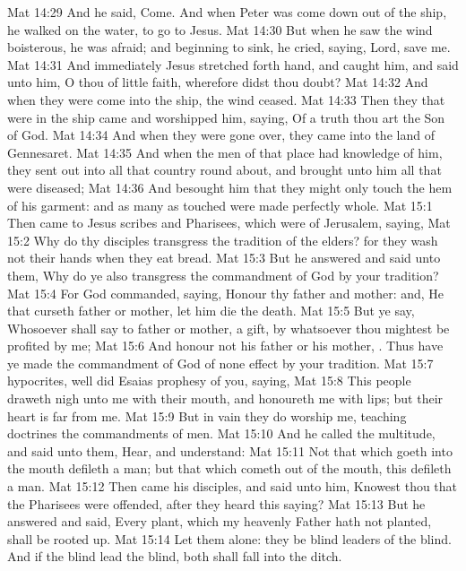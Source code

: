 \vs Mat 14:29 And he said, Come. And when Peter was come down out of the ship, he walked on the water, to go to Jesus.
\vs Mat 14:30 But when he saw the wind boisterous, he was afraid; and beginning to sink, he cried, saying, Lord, save me.
\vs Mat 14:31 And immediately Jesus stretched forth  hand, and caught him, and said unto him, O thou of little faith, wherefore didst thou doubt?
\vs Mat 14:32 And when they were come into the ship, the wind ceased.
\vs Mat 14:33 Then they that were in the ship came and worshipped him, saying, Of a truth thou art the Son of God.
\vs Mat 14:34 And when they were gone over, they came into the land of Gennesaret.
\vs Mat 14:35 And when the men of that place had knowledge of him, they sent out into all that country round about, and brought unto him all that were diseased;
\vs Mat 14:36 And besought him that they might only touch the hem of his garment: and as many as touched were made perfectly whole.
\vs Mat 15:1 Then came to Jesus scribes and Pharisees, which were of Jerusalem, saying,
\vs Mat 15:2 Why do thy disciples transgress the tradition of the elders? for they wash not their hands when they eat bread.
\vs Mat 15:3 But he answered and said unto them, Why do ye also transgress the commandment of God by your tradition?
\vs Mat 15:4 For God commanded, saying, Honour thy father and mother: and, He that curseth father or mother, let him die the death.
\vs Mat 15:5 But ye say, Whosoever shall say to  father or  mother,  a gift, by whatsoever thou mightest be profited by me;
\vs Mat 15:6 And honour not his father or his mother, . Thus have ye made the commandment of God of none effect by your tradition.
\vs Mat 15:7  hypocrites, well did Esaias prophesy of you, saying,
\vs Mat 15:8 This people draweth nigh unto me with their mouth, and honoureth me with  lips; but their heart is far from me.
\vs Mat 15:9 But in vain they do worship me, teaching  doctrines the commandments of men.
\vs Mat 15:10 And he called the multitude, and said unto them, Hear, and understand:
\vs Mat 15:11 Not that which goeth into the mouth defileth a man; but that which cometh out of the mouth, this defileth a man.
\vs Mat 15:12 Then came his disciples, and said unto him, Knowest thou that the Pharisees were offended, after they heard this saying?
\vs Mat 15:13 But he answered and said, Every plant, which my heavenly Father hath not planted, shall be rooted up.
\vs Mat 15:14 Let them alone: they be blind leaders of the blind. And if the blind lead the blind, both shall fall into the ditch.
